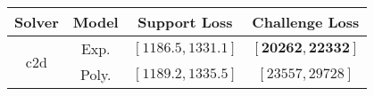 \begin{tabular}{cc|c|c} 
\hline 
 Solver & Model & Support Loss  & Challenge Loss \tabularnewline\hline 
\hline 
\multirow{2}{*}{c2d} & Exp. & $\mathbf{\left[1186.5,1331.1\right]}$ & $\mathbf{\left[20262,22332\right]}$ \tabularnewline 
 & Poly. & $\left[1189.2,1335.5\right]$ & $\left[23557,29728\right]$ \tabularnewline 
\hline 
\end{tabular} 

